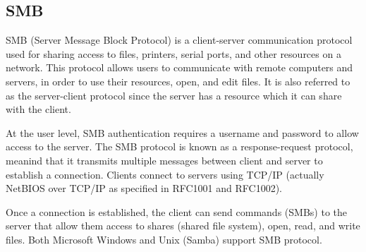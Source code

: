 \documentclass[12pt]{article}
\theoremstyle{definition}
\theoremstyle{definition}
\begin{document}
    \subsection{SMB}
        SMB (Server Message Block Protocol) is a client-server communication
        protocol used for sharing access to files, printers, serial ports, and
        other resources on a network. This protocol allows users to communicate
        with remote computers and servers, in order to use their resources, open,
        and edit files. It is also referred to as the server-client protocol since
        the server has a resource which it can share with the client.\par At the
        user level, SMB authentication requires a username and password to allow
        access to the server. The SMB protocol is known as a response-request
        protocol, meanind that it transmits multiple messages between client
        and server to establish a connection. Clients connect to servers using
        TCP/IP (actually NetBIOS over TCP/IP as specified in RFC1001 and
        RFC1002).\par Once a connection is established, the client can send
        commands (SMBs) to the server that allow them access to shares (shared
        file system), open, read, and write files. Both Microsoft Windows and
        Unix (Samba) support SMB protocol. 
\end{document}

